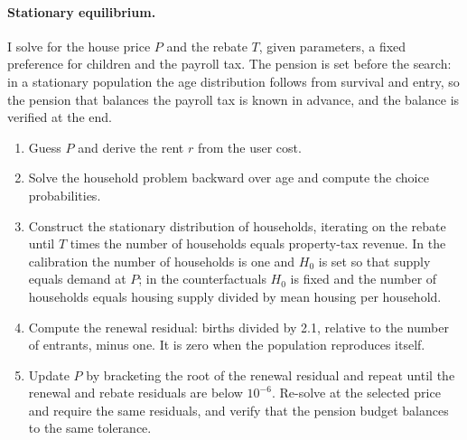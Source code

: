 \paragraph{Stationary equilibrium.} I solve for the house price $P$ and the
rebate $T$, given parameters, a fixed preference for children and the payroll
tax. The pension is set before the search: in a stationary population the
age distribution follows from survival and entry, so the pension that
balances the payroll tax is known in advance, and the balance is verified at
the end.
\begin{enumerate}
\item Guess $P$ and derive the rent $r$ from the user cost.
\item Solve the household problem backward over age and compute the choice
probabilities.
\item Construct the stationary distribution of households, iterating on the
rebate until $T$ times the number of households equals property-tax revenue.
In the calibration the number of households is one and $H_0$ is set so that
supply equals demand at $P$; in the counterfactuals $H_0$ is fixed and the
number of households equals housing supply divided by mean housing per
household.
\item Compute the renewal residual: births divided by 2.1, relative to the
number of entrants, minus one. It is zero when the population reproduces
itself.
\item Update $P$ by bracketing the root of the renewal residual and repeat
until the renewal and rebate residuals are below $10^{-6}$. Re-solve at the
selected price and require the same residuals, and verify that the pension
budget balances to the same tolerance.
\end{enumerate}

